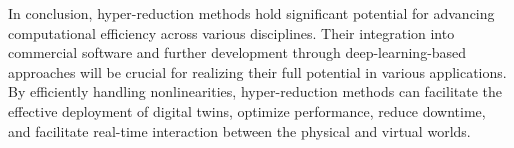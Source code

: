 \documentclass[11pt]{article}
\begin{document}
            In conclusion, hyper-reduction methods hold significant potential for advancing computational efficiency across various disciplines.
            Their integration into commercial software and further development through deep-learning-based approaches will be crucial for realizing their full potential in various applications.
            By efficiently handling nonlinearities, hyper-reduction methods can facilitate the effective deployment of digital twins, optimize performance, reduce downtime, and facilitate real-time interaction between the physical and virtual worlds.


            
            
            \appendix
\end{document}
